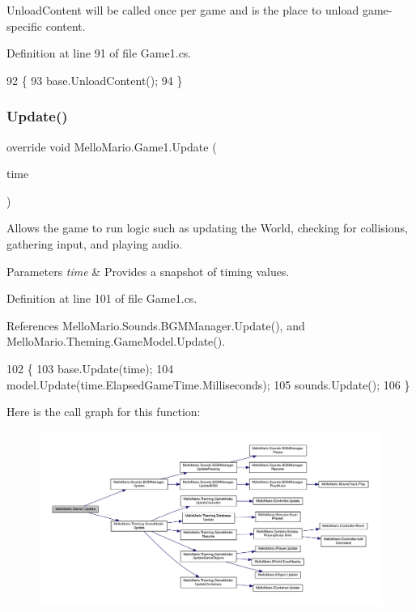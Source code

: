 Unload\+Content will be called once per game and is the place to unload game-\/specific content. 



Definition at line 91 of file Game1.\+cs.


\begin{DoxyCode}
92         \{
93             base.UnloadContent();
94         \}
\end{DoxyCode}
\mbox{\label{classMelloMario_1_1Game1_abe3eff66b402af3861215080c44a8b02}} 
\subsubsection{Update()}
{\footnotesize\ttfamily override void Mello\+Mario.\+Game1.\+Update (\begin{DoxyParamCaption}\item[{Game\+Time}]{time }\end{DoxyParamCaption})\hspace{0.3cm}{\ttfamily [protected]}}



Allows the game to run logic such as updating the World, checking for collisions, gathering input, and playing audio. 


\begin{DoxyParams}{Parameters}
{\em time} & Provides a snapshot of timing values.\\
\hline
\end{DoxyParams}


Definition at line 101 of file Game1.\+cs.



References Mello\+Mario.\+Sounds.\+B\+G\+M\+Manager.\+Update(), and Mello\+Mario.\+Theming.\+Game\+Model.\+Update().


\begin{DoxyCode}
102         \{
103             base.Update(time);
104             model.Update(time.ElapsedGameTime.Milliseconds);
105             sounds.Update();
106         \}
\end{DoxyCode}
Here is the call graph for this function\+:
\nopagebreak
\begin{figure}[H]
\begin{center}
\leavevmode
\includegraphics[width=350pt]{classMelloMario_1_1Game1_abe3eff66b402af3861215080c44a8b02_cgraph}
\end{center}
\end{figure}


